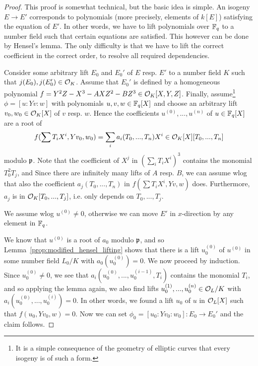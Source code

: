 \begin{proof}
    This proof is somewhat technical, but the basic idea is simple.
    An isogeny $E \to E'$ corresponds to polynomials (more precisely, elements of $k[E]$) satisfying the equation of $E'$.
    In other words, we have to lift polynomials over $\mathbb{F}_q$ to a number field such that certain equations are satisfied.
    This however can be done by Hensel's lemma.
    The only difficulty is that we have to lift the correct coefficient in the correct order, to resolve all required dependencies.

    Consider some arbitrary lift $E_0$ and $E_0'$ of $E$ resp. $E'$ to a number field $K$ such that $j(E_0), j(E_0') \in \mathcal{O}_K$.
    Assume that $E_0'$ is defined by a homogeneous polynomial $f = Y^2Z - X^3 - AXZ^2 - BZ^3 \in \mathcal{O}_K[X, Y, Z]$.
    Finally, assume\footnote{It is a simple consequence of the geometry of elliptic curves that every isogeny is of such a form.} $\phi = [u : Y v : w]$ with polynomials $u, v, w \in \mathbb{F}_q[X]$ and choose an arbitrary lift $v_0, w_0 \in \mathcal{O}_K[X]$ of $v$ resp. $w$.
    Hence the coefficients $u^{(0)}, ..., u^{(n)}$ of $u \in \mathbb{F}_q[X]$ are a root of
    \begin{equation*}
        f(\sum T_i X^i, Y v_0, w_0) = \sum_i a_i(T_0, ..., T_n) X^i \in \mathcal{O}_K[X][T_0, ..., T_n]
    \end{equation*}
    modulo $\mathfrak{p}$.
    Note that the coefficient of $X^j$ in $(\sum_i T_i X^i)^3$ contains the monomial $T_0^2 T_j$, and 
    Since there are infinitely many lifts of $A$ resp. $B$, we can assume wlog that also the coefficient $a_j(T_0, ..., T_n)$ in $f(\sum T_i X^i, Y v, w)$ does.
    Furthermore, $a_j$ is in $\mathcal{O}_K[T_0, ..., T_j]$, i.e. only depends on $T_0, ..., T_j$.

    We assume wlog $u^{(0)} \neq 0$, otherwise we can move $E'$ in $x$-direction by any element in $\mathbb{F}_q$.

    We know that $u^{(0)}$ is a root of $a_0$ modulo $\mathfrak{p}$, and so Lemma~\ref{prop:modified_hensel_lifting} shows that there is a lift $u^{(0)}_0$ of $u^{(0)}$ in some number field $L_0/K$ with $a_0(u^{(0)}_0) = 0$.
    We now proceed by induction.
    Since $u_0^{(0)} \neq 0$, we see that $a_i(u_0^{(0)}, ..., u_0^{(i - 1)}, T_i)$ contains the monomial $T_i$, and so applying the lemma again, we also find lifts $u^{(1)}_0, ..., u^{(n)}_0 \in \mathcal{O}_L/K$ with $a_i(u^{(0)}_0, ..., u^{(i)}_0) = 0$.
    In other words, we found a lift $u_0$ of $u$ in $\mathcal{O}_L[X]$ such that $f(u_0, Y v_0, w) = 0$.
    Now we can set $\phi_0 = [u_0 : Y v_0 : w_0]: E_0 \to E_0'$ and the claim follows.
\end{proof}
